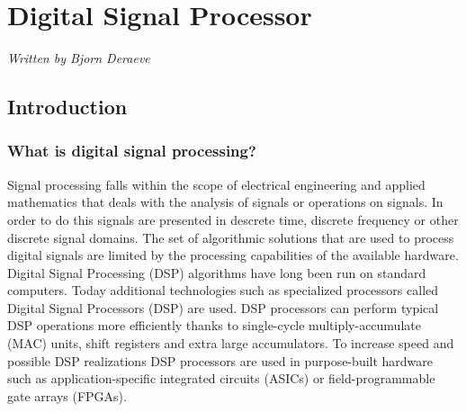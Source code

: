 
\chapter{Digital Signal Processor} %
\label{Chapter5} %
\textsf{\textsl{Written by Bjorn Deraeve}}
\section{Introduction}
\subsection{What is digital signal processing?}
Signal processing falls within the scope of electrical engineering and applied mathematics that deals with the analysis of signals or operations on signals. In order to do this signals are presented in descrete time, discrete frequency or other discrete signal domains. The set of algorithmic solutions that are used to process digital signals are limited by the processing capabilities of the available hardware. 
Digital Signal Processing (DSP) algorithms have long been run on standard computers. Today additional technologies such as specialized processors called Digital Signal Processors (DSP) are used. DSP processors can  perform typical DSP operations more efficiently thanks to single-cycle multiply-accumulate (MAC) units, shift registers and extra large accumulators. To increase speed and possible DSP realizations DSP processors are used in purpose-built hardware such as application-specific integrated circuits (ASICs) or field-programmable gate arrays (FPGAs).


